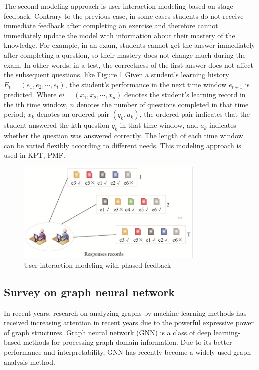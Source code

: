 \documentclass[11pt,en]{elegantpaper}
\begin{document}
The second modeling approach is user interaction modeling based on stage feedback. Contrary to the previous case, in some cases students do not receive immediate feedback after completing an exercise and therefore cannot immediately update the model with information about their mastery of the knowledge. For example, in an exam, students cannot get the answer immediately after completing a question, so their mastery does not change much during the exam. In other words, in a test, the correctness of the first answer does not affect the subsequent questions, like Figure \ref{kt2} Given a student's learning history $E_t=(e_1,e_2,⋯,e_t)$, the student's performance in the next time window $e_{t+1}$ is predicted. Where $ei=(x_1,x_2,⋯,x_n)$ denotes the student's learning record in the ith time window, $n$ denotes the number of questions completed in that time period; $x_k$ denotes an ordered pair $(q_k,a_k)$, the ordered pair indicates that the student answered the kth question $q_k$ in that time window, and $a_k$ indicates whether the question was answered correctly. The length of each time window can be varied flexibly according to different needs. This modeling approach is used in KPT, PMF.

\begin{figure}[h]
	\centering
	\includegraphics[width=0.8\textwidth]{./image/kt2.png}
	\caption{User interaction modeling with phased feedback}
	\label{kt2}
\end{figure}


\subsection{Survey on graph neural network}
In recent years, research on analyzing graphs by machine learning methods has received increasing attention in recent years due to the powerful expressive power of graph structures. Graph neural network (GNN) is a class of deep learning-based methods for processing graph domain information. Due to its better performance and interpretability, GNN has recently become a widely used graph analysis method.
\end{document}
